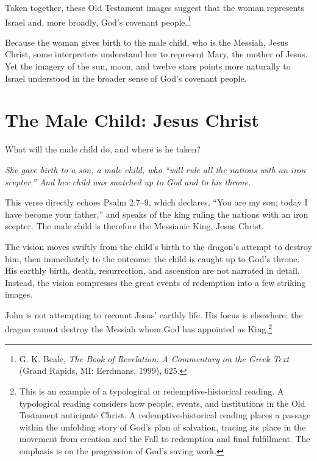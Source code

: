 Taken together, these Old Testament images suggest that the woman represents Israel and, more broadly, God's covenant people.\footnote{G. K. Beale, \textit{The Book of Revelation: A Commentary on the Greek Text} (Grand Rapids, MI: Eerdmans, 1999), 625.}

Because the woman gives birth to the male child, who is the Messiah, Jesus Christ, some interpreters understand her to represent Mary, the mother of Jesus. Yet the imagery of the sun, moon, and twelve stars points more naturally to Israel understood in the broader sense of God's covenant people.

\section{The Male Child: Jesus Christ}

\begin{ScriptureBox2}{What will the male child do, and where is he taken?}

\item[12:5] \textit{She gave birth to a son, a male child, who “will rule all the nations with an iron scepter.” And her child was snatched up to God and to his throne.}

\end{ScriptureBox2}

This verse directly echoes Psalm 2:7--9, which declares, “You are my son; today I have become your father,” and speaks of the king ruling the nations with an iron scepter. The male child is therefore the Messianic King, Jesus Christ.

The vision moves swiftly from the child's birth to the dragon's attempt to destroy him, then immediately to the outcome: the child is caught up to God's throne. His earthly birth, death, resurrection, and ascension are not narrated in detail. Instead, the vision compresses the great events of redemption into a few striking images.

John is not attempting to recount Jesus' earthly life. His focus is elsewhere: the dragon cannot destroy the Messiah whom God has appointed as King.\footnote{This is an example of a typological or redemptive-historical reading. A typological reading considers how people, events, and institutions in the Old Testament anticipate Christ. A redemptive-historical reading places a passage within the unfolding story of God's plan of salvation, tracing its place in the movement from creation and the Fall to redemption and final fulfillment. The emphasis is on the progression of God's saving work.}


